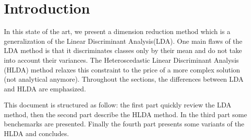 
\section{Introduction}
\label{sec:introduction}

In this state of the art, we present a dimension reduction method
which is a generalization of the Linear Discriminant Analysis(LDA).
One main flaws of the LDA method
is that it discriminates classes only by their mean and do not take into
account their variances. The Heteroscedastic Linear Discriminant Analysis (HLDA)
method relaxes this constraint to the price of a more complex solution
(not analytical anymore). Throughout the sections, the differences between LDA and
HLDA are emphasized.

This document is structured as follow: the first part quickly review the LDA method,
then the second part describe the HLDA method. In the third part some benchemarks
are presented. Finally the fourth part presents some variants of the HLDA and concludes.
